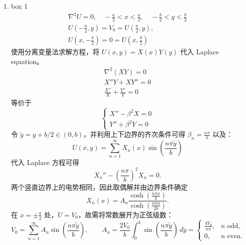 \documentclass[a4paper]{article}
\begin{document}
\begin{enumerate}
    \item[(a)] box 1
        \begin{gather*}
            \nabla^2 U = 0, \quad -\frac{a}{2} < x < \frac{a}{2}, \quad -\frac{b}{2} < y < \frac{b}{2} \\
            U\left(-\frac{a}{2}, y\right) = V_0 = U\left(\frac{a}{2}, y\right),\\
            U\left(x, -\frac{b}{2}\right) = 0 = U\left(x, \frac{b}{2}\right)
        \end{gather*}
        使用分离变量法求解方程，将 \(U(x, y) = X(x)Y(y)\) 代入 Laplace equation。
        \begin{gather*}
            \nabla^2 (XY) = 0 \\
            X''Y + XY'' = 0\\
            \frac{X''}{X} + \frac{Y''}{Y} = 0
        \end{gather*}
        等价于
        \begin{equation*}
            \begin{cases}
                X'' - \beta^2 X = 0 \\
                Y'' + \beta^2 Y = 0
            \end{cases}
        \end{equation*}
        令 $\tilde{y}=y+b/2\in(0,b)$，并利用上下边界的齐次条件可得 $\beta_n = \frac{n\pi}{b}$ 以及：
        \begin{equation*}
            U(x,y)=\sum_{n=1}^{\infty}X_n(x)
            \sin\!\left(\frac{n\pi\tilde{y}}{b}\right)
        \end{equation*}
        代入 Laplace 方程可得
        \begin{equation*}
            X_n''-\left(\frac{n\pi}{b}\right)^2X_n=0.
        \end{equation*}
        两个竖直边界上的电势相同，因此取偶解并由边界条件确定
        \begin{equation*}
            X_n(x)=A_n\frac{\cosh\left(\frac{n\pi x}{b}\right)}{\cosh\left(\frac{n\pi a}{2b}\right)}.
        \end{equation*}
        在 $x=\pm \frac{a}{2}$ 处，$U=V_0$，故需将常数展开为正弦级数：
        \begin{equation*}
            V_0=\sum_{n=1}^{\infty}A_n
            \sin\!\left(\frac{n\pi\tilde{y}}{b}\right),\qquad
            A_n=\frac{2V_0}{b}\int_0^b\sin\!\left(\frac{n\pi\tilde{y}}{b}\right)\,d\tilde{y}
            =\begin{cases}\displaystyle \frac{4V_0}{n\pi},&n\text{ odd},\\[4pt]0,&n\text{ even}.

\end{cases}
\end{equation*}
\end{enumerate}
\end{document}
